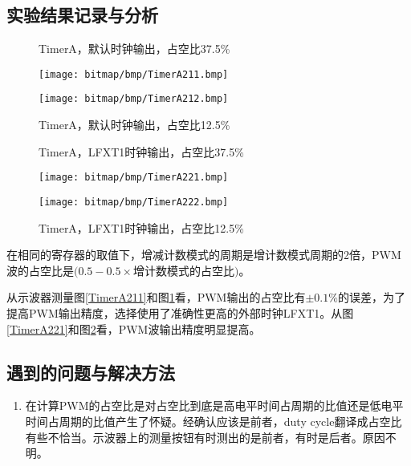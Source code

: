 \subsection{实验结果记录与分析}
\begin{figure}[htbp]
	\centering
	\begin{minipage}[htbp]{7.5cm}
		\centering
		\caption{TimerA，默认时钟输出，占空比37.5\%}
		\label{TimerA211}
		\texttt{[image: bitmap/bmp/TimerA211.bmp]}
	\end{minipage}
	\begin{minipage}[htbp]{7.5cm}
		\centering
		\caption{TimerA，默认时钟输出，占空比12.5\%}
		\label{TimerA212}
		\texttt{[image: bitmap/bmp/TimerA212.bmp]}
	\end{minipage}
\end{figure}
\begin{figure}[htbp]
	\centering
	\begin{minipage}[htbp]{7.5cm}
		\centering
		\caption{TimerA，LFXT1时钟输出，占空比37.5\%}
		\label{TimerA221}
		\texttt{[image: bitmap/bmp/TimerA221.bmp]}
	\end{minipage}
	\begin{minipage}[htbp]{7.5cm}
		\centering
		\caption{TimerA，LFXT1时钟输出，占空比12.5\%}
		\label{TimerA222}
		\texttt{[image: bitmap/bmp/TimerA222.bmp]}
	\end{minipage}
\end{figure}
\par\indent 在相同的寄存器的取值下，增减计数模式的周期是增计数模式周期的2倍，PWM波的占空比是\((0.5-0.5\times\)增计数模式的占空比\()\)。
\par\indent 从示波器测量图\ref{TimerA211}和图\ref{TimerA212}看，PWM输出的占空比有\(\pm0.1\%\)的误差，为了提高PWM输出精度，选择使用了准确性更高的外部时钟LFXT1。从图\ref{TimerA221}和图\ref{TimerA222}看，PWM波输出精度明显提高。
\subsection{遇到的问题与解决方法}
\begin{enumerate}
	\item 在计算PWM的占空比是对占空比到底是高电平时间占周期的比值还是低电平时间占周期的比值产生了怀疑。经确认应该是前者，duty cycle翻译成占空比有些不恰当。示波器上的测量按钮有时测出的是前者，有时是后者。原因不明。
\end{enumerate}


